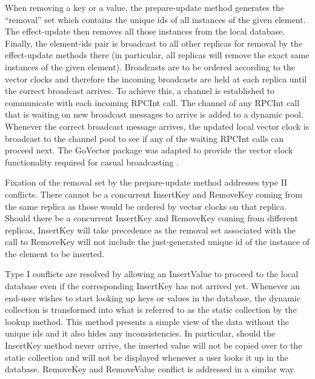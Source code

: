 \documentclass[sigconf,nonacm,10pt]{acmart}
\begin{document}
When removing a key or a value, the prepare-update method generates the ``removal'' set which contains the unique ids of all instances of the given element. The effect-update then removes all those instances from the local database. Finally, the element-ids pair is broadcast to all other replicas for removal by the effect-update methods there (in particular, all replicas will remove the exact same instances of the given element).
Broadcasts are to be ordered according to the vector clocks and therefore the incoming broadcasts are held at each replica until the correct broadcast arrives. To achieve this, a channel is established to communicate with each incoming RPCInt call. The channel of any RPCInt call that is waiting on new broadcast messages to arrive is added to a dynamic pool. Whenever the correct broadcast message arrives, the updated local vector clock is broadcast to the channel pool to see if any of the waiting RPCInt calls can proceed next. The GoVector package was adapted to provide the vector clock functionality required for casual broadcasting \cite{distributedclocks}.

Fixation of the removal set by the prepare-update method addresses type II conflicts. There cannot be a concurrent InsertKey and RemoveKey coming from the same replica as those would be ordered by vector clocks on that replica. Should there be a concurrent InsertKey and RemoveKey coming from different replicas, InsertKey will take precedence as the removal set associated with the call to RemoveKey will not include the just-generated unique id of the instance of the element to be inserted.

Type I conflicts are resolved by allowing an InsertValue to proceed to the local database even if the corresponding InsertKey has not arrived yet. Whenever an end-user wishes to start looking up keys or values in the database, the dynamic collection is transformed into what is referred to as the static collection by the lookup method. This method presents a simple view of the data without the unique ids and it also hides any inconsistencies. In particular, should the InsertKey method never arrive, the inserted value will not be copied over to the static collection and will not be displayed whenever a user looks it up in the database. RemoveKey and RemoveValue conflict is addressed in a similar way.
\end{document}
